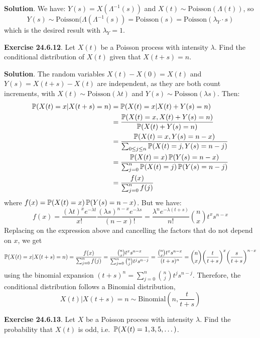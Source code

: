 \textbf{Solution}.
We have: \(Y(s) = X(\Lambda^{-1}(s))\) and
\(X(t) \sim \text{Poisson}(\Lambda(t))\), so
\[
Y(s) \sim \text{Poisson}(\Lambda(\Lambda^{-1}(s)) = \text{Poisson}(s) = \text{Poisson}(\lambda_Y \cdot s)
\]
which is the desired result with \(\lambda_Y = 1\).

\textbf{Exercise 24.6.12}. Let \(X(t)\) be a Poisson process with
intensity \(\lambda\). Find the conditional distribution of \(X(t)\)
given that \(X(t + s) = n\).

\textbf{Solution}. The random variables \(X(t) - X(0) = X(t)\) and
\(Y(s) = X(t + s) - X(t)\) are independent, as they are both count
increments, with \(X(t) \sim \text{Poisson}(\lambda t)\) and
\(Y(s) \sim \text{Poisson}(\lambda s)\). Then:
\begin{align*}
\PROB\left(X(t) = x | X(t + s) = n\right) &= \PROB\left(X(t) = x | X(t) + Y(s) = n\right) \\
&= \frac{\PROB\left(X(t) = x, X(t) + Y(s) = n\right)}{\PROB\left(X(t) + Y(s) = n\right)} \\
&= \frac{\PROB\left(X(t) = x, Y(s) = n - x\right)}{\sum_{0 \leq j \leq n} \PROB\left(X(t) = j, Y(s) = n - j\right)} \\
&= \frac{\PROB\left(X(t) = x\right) \PROB\left(Y(s) = n - x\right)}{\sum_{j=0}^{n} \PROB\left(X(t) = j\right) \PROB\left( Y(s) = n - j\right)} \\
&= \frac{f(x)}{\sum_{j=0}^{n} f(j) }
\end{align*}
where
\(f(x) = \PROB\left(X(t) = x\right) \PROB\left( Y(s) = n - x\right)\).
But we have:
\[
f(x) = \frac{(\lambda t)^x e^{-\lambda t}}{x!}\frac{(\lambda s)^{n - x} e^{-\lambda s}}{(n - x)!} = \frac{\lambda^{n} e^{-\lambda (t + s)}}{n!} \binom{n}{x} t^x s^{n - x}
\]
Replacing on the expression above and cancelling the factors that do not
depend on \(x\), we get
\[
\PROB\left(X(t) = x | X(t + s) = n\right) = \frac{f(x)}{\sum_{j=0}^{n} f(j) } = \frac{\binom{n}{x} t^x s^{n - x}}{\sum_{j=0}^{n} \binom{n}{j} t^{j} s^{n - j}} 
= \frac{\binom{n}{x} t^x s^{n - x}}{(t + s)^{n}} = \binom{n}{x} \left( \frac{t}{t + s} \right)^x \left( \frac{s}{t + s}\right)^{n - x}
\]
using the binomial expansion
\((t + s)^{n} = \sum_{j=0}^{n} \binom{n}{j} t^{j} s^{n - j}\). Therefore, the
conditional distribution follows a Binomial distribution,
\[
X(t) | X(t + s) = n \sim \text{Binomial}\left(n, \frac{t}{t + s} \right)
\]

\textbf{Exercise 24.6.13}. Let \(X\) be a Poisson process with intensity
\(\lambda\). Find the probability that \(X(t)\) is odd,
i.e.~\(\operatorname{\mathbb{P}}(X(t) = 1, 3, 5, \dots)\).


